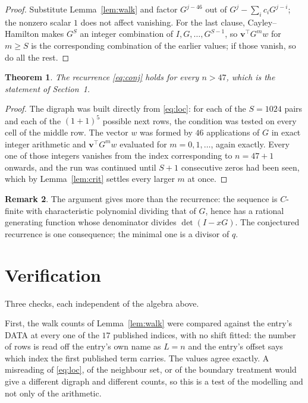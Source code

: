 \documentclass[11pt,a4paper]{article}
\theoremstyle{plain}
\newtheorem{theorem}{Theorem}
\theoremstyle{definition}
\newtheorem{remark}[theorem]{Remark}
\begin{document}
\begin{proof}
Substitute Lemma~\ref{lem:walk} and factor $G^{j-46}$ out of
$G^{j}-\sum_ic_iG^{j-i}$; the nonzero scalar $1$ does not affect
vanishing. For the last clause, Cayley--Hamilton makes $G^{S}$ an integer combination of
$I,G,\dots,G^{S-1}$, so $\mathbf{v}^{\!\top}G^{m}w$ for $m\ge S$ is the corresponding
combination of the earlier values; if those vanish, so do all the rest.
\end{proof}

\begin{theorem}
The recurrence \eqref{eq:conj} holds for every $n>47$, which is the statement of
Section~1.
\end{theorem}

\begin{proof}
The digraph was built directly from \eqref{eq:loc}: for each of the $S=1024$ pairs and each
of the $(1+1)^{5}$ possible next rows, the condition was tested on every cell of
the middle row. The vector $w$ was formed by $46$ applications of $G$ in exact integer
arithmetic and $\mathbf{v}^{\!\top}G^{m}w$ evaluated for $m=0,1,\dots$, again exactly.
Every one of those integers vanishes from the index corresponding to $n=47+1$ onwards,
and the run was continued until $S+1$ consecutive zeros had been seen, which by
Lemma~\ref{lem:crit} settles every larger $m$ at once.
\end{proof}

\begin{remark}
The argument gives more than the recurrence: the sequence is $C$-finite with characteristic
polynomial dividing that of $G$, hence has a rational generating function whose denominator
divides $\det(I-xG)$. The conjectured recurrence is one consequence; the minimal one is a
divisor of $q$.
\end{remark}

\section{Verification}

Three checks, each independent of the algebra above.

First, the walk counts of Lemma~\ref{lem:walk} were compared against the entry's DATA at
every one of the $17$ published indices, with no shift fitted: the number of rows is
read off the entry's own name as $L=n$ and the entry's offset says which index the first
published term carries. The values agree exactly. A misreading of \eqref{eq:loc}, of the
neighbour set, or of the boundary treatment would give a different digraph and different
counts, so this is a test of the modelling and not only of the arithmetic.
\end{document}
